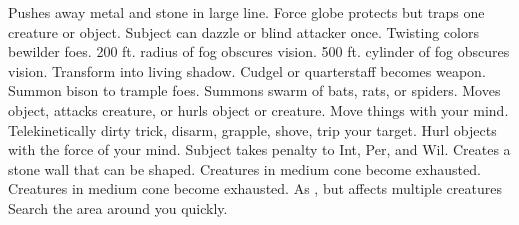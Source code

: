     {Pushes away metal and stone in large line.}
    {Force globe protects but traps one creature or object.}
    {Subject can dazzle or blind attacker once.}
    {Twisting colors bewilder foes.}
    {200 ft. radius of fog obscures vision.}
    {500 ft. cylinder of fog obscures vision.}
    {Transform into living shadow.}
    {Cudgel or quarterstaff becomes  weapon.}
    {Summon bison to trample foes.}
    {Summons swarm of bats, rats, or spiders.}
    {Moves object, attacks creature, or hurls object or creature.}
    {Move things with your mind.}
    {Telekinetically dirty trick, disarm, grapple, shove, trip your target.}
    {Hurl objects with the force of your mind.}
    {Subject takes  penalty to Int, Per, and Wil.}
    {Creates a stone wall that can be shaped.}
    {Creatures in medium cone become exhausted.}
    {Creatures in medium cone become exhausted.}
    {As , but affects multiple creatures}
    {Search the area around you quickly.}
